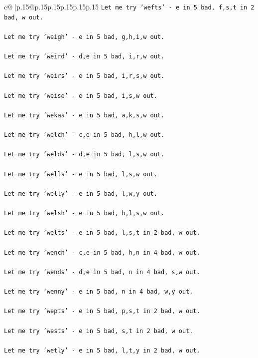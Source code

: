 \documentclass{article}
\begin{document}
{\begin{supertabular}{c@{$\;$}|p{.15\linewidth}@{}p{.15\linewidth}p{.15\linewidth}p{.15\linewidth}p{.15\linewidth}p{.15\linewidth}}
{{{\texttt{Let me try 'wefts' {-} e in 5 bad, f,s,t in 2 bad, w out. } \\
\\ 
\texttt{Let me try 'weigh' {-} e in 5 bad, g,h,i,w out. } \\
\\ 
\texttt{Let me try 'weird' {-} d,e in 5 bad, i,r,w out. } \\
\\ 
\texttt{Let me try 'weirs' {-} e in 5 bad, i,r,s,w out. } \\
\\ 
\texttt{Let me try 'weise' {-} e in 5 bad, i,s,w out. } \\
\\ 
\texttt{Let me try 'wekas' {-} e in 5 bad, a,k,s,w out. } \\
\\ 
\texttt{Let me try 'welch' {-} c,e in 5 bad, h,l,w out. } \\
\\ 
\texttt{Let me try 'welds' {-} d,e in 5 bad, l,s,w out. } \\
\\ 
\texttt{Let me try 'wells' {-} e in 5 bad, l,s,w out. } \\
\\ 
\texttt{Let me try 'welly' {-} e in 5 bad, l,w,y out. } \\
\\ 
\texttt{Let me try 'welsh' {-} e in 5 bad, h,l,s,w out. } \\
\\ 
\texttt{Let me try 'welts' {-} e in 5 bad, l,s,t in 2 bad, w out. } \\
\\ 
\texttt{Let me try 'wench' {-} c,e in 5 bad, h,n in 4 bad, w out. } \\
\\ 
\texttt{Let me try 'wends' {-} d,e in 5 bad, n in 4 bad, s,w out. } \\
\\ 
\texttt{Let me try 'wenny' {-} e in 5 bad, n in 4 bad, w,y out. } \\
\\ 
\texttt{Let me try 'wepts' {-} e in 5 bad, p,s,t in 2 bad, w out. } \\
\\ 
\texttt{Let me try 'wests' {-} e in 5 bad, s,t in 2 bad, w out. } \\
\\ 
\texttt{Let me try 'wetly' {-} e in 5 bad, l,t,y in 2 bad, w out. } \\
}}}
\end{supertabular}}
\end{document}
